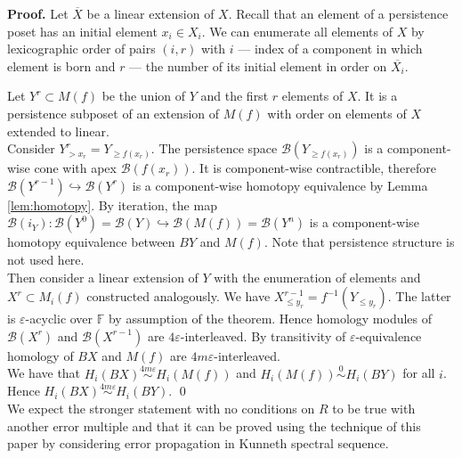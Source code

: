 \documentclass[english,12pt]{article}
\numberwithin{equation}{section}
\theoremstyle{definition}
\theoremstyle{remark}
\newenvironment{pf}{\noindent\textbf{Proof.}}{\qed}
\renewcommand{\leq}{\leqslant}
\renewcommand{\geq}{\geqslant}
\begin{document}
\begin{pf}
  Let $\overline{X}$ be a linear extension of $X$. Recall that an element of a persistence poset has an initial element $x_i \in X_i$. We can enumerate all elements of $X$ by lexicographic order of pairs $(i,r)$ with $i$ --- index of a component in which element is born and $r$ --- the number of its initial element in order on $\overline{X_i}$.

  Let $Y^r \subset M(f)$ be the union of $Y$ and the first $r$ elements of $X$. It is a persistence subposet of an extension of $M(f)$ with order on elements of $X$ extended to linear.\\

  Consider $Y^r_{>x_r} = Y_{\geq f(x_r)}$. The persistence space $\mathcal{B}(Y_{\geq f(x_r)})$ is a component-wise cone with apex $\mathcal{B}(f(x_r))$. It is component-wise contractible, therefore $\mathcal{B}(Y^{r-1}) \hookrightarrow \mathcal{B}(Y^{r})$ is a component-wise homotopy equivalence by Lemma \ref{lem:homotopy}. By iteration, the map $\mathcal{B}(i_Y) : \mathcal{B}(Y^{0}) = \mathcal{B}(Y) \hookrightarrow \mathcal{B}(M(f)) = \mathcal{B}(Y^n)$ is a component-wise homotopy equivalence between $BY$ and $M(f)$. Note that persistence structure is not used here.\\

  Then consider a linear extension of $Y$ with the enumeration of elements and $X^r \subset M_i(f)$ constructed analogously. We have $X^{r-1}_{\leq y_r} = f^{-1}(Y_{\leqslant y_r})$. The latter is $\varepsilon$-acyclic over $\mathbb{F}$ by assumption of the theorem. Hence homology modules of $\mathcal{B}(X^{r})$ and $\mathcal{B}(X^{r-1})$ are $4\varepsilon$-interleaved. By transitivity of $\varepsilon$-equivalence homology of $BX$ and $M(f)$ are $4m\varepsilon$-interleaved.\\

  We have that $H_i(BX) \stackrel{4m\varepsilon}{\sim} H_i(M(f))$ and $H_i(M(f)) \stackrel{0}{\sim} H_i(BY)$ for all $i$. Hence $H_i(BX) \stackrel{4m\varepsilon}{\sim} H_i(BY)$.
\end{pf}\\

We expect the stronger statement with no conditions on $R$ to be true with another error multiple and that it can be proved using the technique of this paper by considering error propagation in Kunneth spectral sequence.
\end{document}
